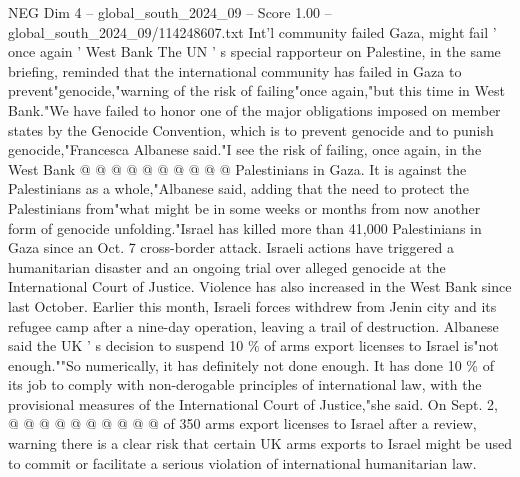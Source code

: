 \begin{textsample}{NEG Dim 4 – global\_south\_2024\_09 – Score 1.00 – global\_south\_2024\_09/114248607.txt}
Int'l community failed Gaza, might fail ' once again ' West Bank The UN ' s special rapporteur on Palestine, in the same briefing, reminded that the international community has failed in Gaza to prevent"genocide,"warning of the risk of failing"once again,"but this time in West Bank."We have failed to honor one of the major obligations imposed on member states by the Genocide Convention, which is to prevent genocide and to punish genocide,"Francesca Albanese said."I see the risk of failing, once again, in the West Bank @ @ @ @ @ @ @ @ @ @ Palestinians in Gaza.
It is against the Palestinians as a whole,"Albanese said, adding that the need to protect the Palestinians from"what might be in some weeks or months from now another form of genocide unfolding."Israel has killed more than 41,000 Palestinians in Gaza since an Oct. 7 cross-border attack.
Israeli actions have triggered a humanitarian disaster and an ongoing trial over alleged genocide at the International Court of Justice.
Violence has also increased in the West Bank since last October.
Earlier this month, Israeli forces withdrew from Jenin city and its refugee camp after a nine-day operation, leaving a trail of destruction.
Albanese said the UK ' s decision to suspend 10 \% of arms export licenses to Israel is"not enough.""So numerically, it has definitely not done enough.
It has done 10 \% of its job to comply with non-derogable principles of international law, with the provisional measures of the International Court of Justice,"she said.
On Sept. 2, @ @ @ @ @ @ @ @ @ @ of 350 arms export licenses to Israel after a review, warning there is a clear risk that certain UK arms exports to Israel might be used to commit or facilitate a serious violation of international humanitarian law.

\end{textsample}
